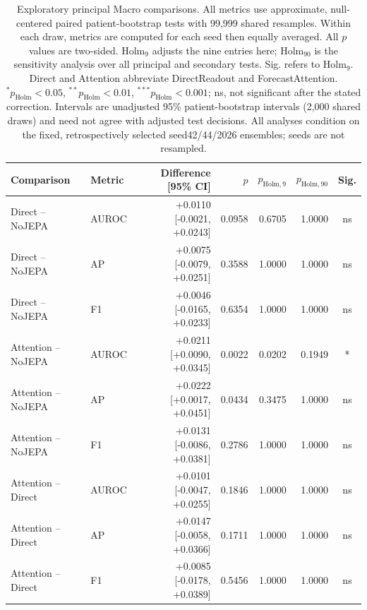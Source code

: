 \begin{table}[t]
\centering
\small
\caption{Exploratory principal Macro comparisons. All metrics use approximate, null-centered paired patient-bootstrap tests with 99,999 shared resamples. Within each draw, metrics are computed for each seed then equally averaged. All $p$ values are two-sided. Holm$_9$ adjusts the nine entries here; Holm$_{90}$ is the sensitivity analysis over all principal and secondary tests. Sig. refers to Holm$_9$. Direct and Attention abbreviate DirectReadout and ForecastAttention. $^{*}p_{\mathrm{Holm}}<0.05$, $^{**}p_{\mathrm{Holm}}<0.01$, $^{***}p_{\mathrm{Holm}}<0.001$; ns, not significant after the stated correction. Intervals are unadjusted 95\% patient-bootstrap intervals (2,000 shared draws) and need not agree with adjusted test decisions. All analyses condition on the fixed, retrospectively selected seed42/44/2026 ensembles; seeds are not resampled.}
\label{tab:bootstrap}
\begin{tabular}{llrrrrc}
\toprule
Comparison & Metric & Difference [95\% CI] & $p$ & $p_{\mathrm{Holm},9}$ & $p_{\mathrm{Holm},90}$ & Sig. \\
\midrule
Direct -- NoJEPA & AUROC & +0.0110 [-0.0021, +0.0243] & 0.0958 & 0.6705 & 1.0000 & ns \\
Direct -- NoJEPA & AP & +0.0075 [-0.0079, +0.0251] & 0.3588 & 1.0000 & 1.0000 & ns \\
Direct -- NoJEPA & F1 & +0.0046 [-0.0165, +0.0233] & 0.6354 & 1.0000 & 1.0000 & ns \\
Attention -- NoJEPA & AUROC & +0.0211 [+0.0090, +0.0345] & 0.0022 & 0.0202 & 0.1949 & * \\
Attention -- NoJEPA & AP & +0.0222 [+0.0017, +0.0451] & 0.0434 & 0.3475 & 1.0000 & ns \\
Attention -- NoJEPA & F1 & +0.0131 [-0.0086, +0.0381] & 0.2786 & 1.0000 & 1.0000 & ns \\
Attention -- Direct & AUROC & +0.0101 [-0.0047, +0.0255] & 0.1846 & 1.0000 & 1.0000 & ns \\
Attention -- Direct & AP & +0.0147 [-0.0058, +0.0366] & 0.1711 & 1.0000 & 1.0000 & ns \\
Attention -- Direct & F1 & +0.0085 [-0.0178, +0.0389] & 0.5456 & 1.0000 & 1.0000 & ns \\
\bottomrule
\end{tabular}
\end{table}
